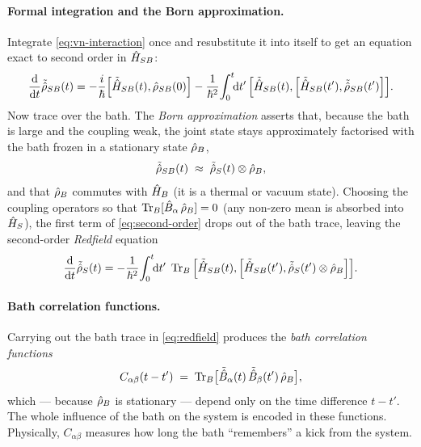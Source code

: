 \paragraph{Formal integration and the Born approximation.}
Integrate \cref{eq:vn-interaction} once and resubstitute it into
itself to get an equation exact to second order in $\hat{H}_{SB}$:
\begin{equation}
\label{eq:second-order}
\frac{\dd}{\dd t}\tilde{\op\rho}_{SB}(t)
= -\frac{i}{\hbar}\comm{\tilde{\op H}_{SB}(t)}{\op\rho_{SB}(0)}
- \frac{1}{\hbar^2}\!\int_0^t\!\!\dd t'\,
\comm{\tilde{\op H}_{SB}(t)}{\comm{\tilde{\op H}_{SB}(t')}{\tilde{\op\rho}_{SB}(t')}}.
\end{equation}
Now trace over the bath. The \emph{Born approximation} asserts that,
because the bath is large and the coupling weak, the joint state
stays approximately factorised with the bath frozen in a stationary
state $\hat{\rho}_B$,
\begin{equation}
\label{eq:born-factorisation}
\tilde{\hat{\rho}}_{SB}(t) \;\approx\; \tilde{\hat{\rho}}_S(t)\otimes\hat{\rho}_B,
\end{equation}
and that $\hat{\rho}_B$ commutes with $\hat{H}_B$ (it is a thermal or
vacuum state). Choosing the coupling operators so that
$\operatorname{Tr}_B[\hat{B}_\alpha\,\hat{\rho}_B]=0$ (any non-zero mean is absorbed
into $\hat{H}_S$), the first term of \cref{eq:second-order} drops out
of the bath trace, leaving the second-order \emph{Redfield}
equation
\begin{equation}
\label{eq:redfield}
\frac{\dd}{\dd t}\tilde{\op\rho}_S(t)
= -\frac{1}{\hbar^2}\!\int_0^t\!\!\dd t'\;
\Tr_B\comm{\tilde{\op H}_{SB}(t)}{\comm{\tilde{\op H}_{SB}(t')}{\tilde{\op\rho}_S(t')\otimes\op\rho_B}}.
\end{equation}

\paragraph{Bath correlation functions.}
Carrying out the bath trace in \cref{eq:redfield} produces the
\emph{bath correlation functions}
\begin{equation}
\label{eq:bath-correlation}
C_{\alpha\beta}(t-t') \;=\; \operatorname{Tr}_B\bigl[\tilde{\hat{B}}_\alpha(t)\,\tilde{\hat{B}}_\beta(t')\,\hat{\rho}_B\bigr],
\end{equation}
which --- because $\hat{\rho}_B$ is stationary --- depend only on the
time difference $t-t'$. The whole influence of the bath on the
system is encoded in these functions. Physically, $C_{\alpha\beta}$
measures how long the bath ``remembers'' a kick from the system.

